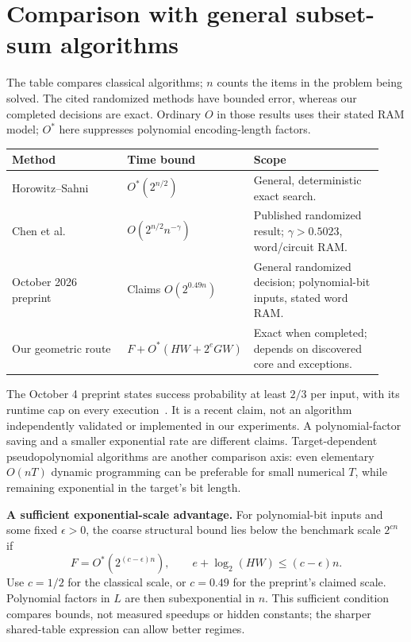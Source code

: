 \documentclass[10pt,english]{article}
\begin{document}
\newpage
\section{Comparison with general subset-sum algorithms}
The table compares classical algorithms; $n$ counts the items in the problem being solved. The cited randomized methods have bounded error, whereas our completed decisions are exact. Ordinary $O$ in those results uses their stated RAM model; $O^*$ here suppresses polynomial encoding-length factors.

\begin{center}
\small
\begin{tabular}{@{}p{0.31\linewidth}p{0.27\linewidth}p{0.35\linewidth}@{}}
\toprule
Method & Time bound & Scope \\
\midrule
Horowitz--Sahni~\cite{hs} & $O^*(2^{n/2})$ & General, deterministic exact search. \\
Chen et al.~\cite{cjrs} & $O(2^{n/2}n^{-\gamma})$ & Published randomized result; $\gamma>0.5023$, word/circuit RAM. \\
October 2026 preprint~\cite{oai} & Claims $O(2^{0.49n})$ & General randomized decision; polynomial-bit inputs, stated word RAM. \\
Our geometric route & $F+O^*(HW+2^eGW)$ & Exact when completed; depends on discovered core and exceptions. \\
\bottomrule
\end{tabular}
\end{center}

The October 4 preprint states success probability at least $2/3$ per input, with its runtime cap on every execution~\cite{oai}. It is a recent claim, not an algorithm independently validated or implemented in our experiments. A polynomial-factor saving and a smaller exponential rate are different claims. Target-dependent pseudopolynomial algorithms are another comparison axis: even elementary $O(nT)$ dynamic programming can be preferable for small numerical $T$, while remaining exponential in the target's bit length.

\textbf{A sufficient exponential-scale advantage.} For polynomial-bit inputs and some fixed $\epsilon>0$, the coarse structural bound lies below the benchmark scale $2^{cn}$ if
$$
F=O^*(2^{(c-\epsilon)n}),\qquad e+\log_2(HW)\le(c-\epsilon)n.
$$
Use $c=1/2$ for the classical scale, or $c=0.49$ for the preprint's claimed scale. Polynomial factors in $L$ are then subexponential in $n$. This sufficient condition compares bounds, not measured speedups or hidden constants; the sharper shared-table expression can allow better regimes.
\end{document}
